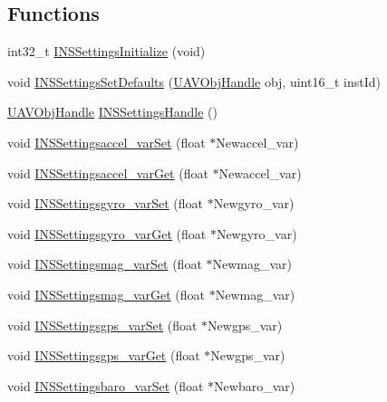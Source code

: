 \subsection*{\-Functions}
\begin{DoxyCompactItemize}
\item 
int32\-\_\-t \hyperlink{group___i_n_s_settings_ga0296ec40c6cd3d7e7ad7924e11409247}{\-I\-N\-S\-Settings\-Initialize} (void)
\item 
void \hyperlink{group___i_n_s_settings_ga27f5ee3b187af138d469575eb7a216e9}{\-I\-N\-S\-Settings\-Set\-Defaults} (\hyperlink{targets_2_u_a_v_objects_2inc_2uavobjectmanager_8h_a279053e22be53ce9f895043aaeb91e3b}{\-U\-A\-V\-Obj\-Handle} obj, uint16\-\_\-t inst\-Id)
\item 
\hyperlink{targets_2_u_a_v_objects_2inc_2uavobjectmanager_8h_a279053e22be53ce9f895043aaeb91e3b}{\-U\-A\-V\-Obj\-Handle} \hyperlink{group___i_n_s_settings_gab490723d4fa23d173e7dff613545c6b8}{\-I\-N\-S\-Settings\-Handle} ()
\item 
void \hyperlink{group___i_n_s_settings_ga04de3ca77dd5e44adbd3cd39f0b6efab}{\-I\-N\-S\-Settingsaccel\-\_\-var\-Set} (float $\ast$\-Newaccel\-\_\-var)
\item 
void \hyperlink{group___i_n_s_settings_ga4a62ce50a506308ba57016b882512c38}{\-I\-N\-S\-Settingsaccel\-\_\-var\-Get} (float $\ast$\-Newaccel\-\_\-var)
\item 
void \hyperlink{group___i_n_s_settings_gae8a5bd32b38c8e5f066c1509e9cef46a}{\-I\-N\-S\-Settingsgyro\-\_\-var\-Set} (float $\ast$\-Newgyro\-\_\-var)
\item 
void \hyperlink{group___i_n_s_settings_gadf76904ba3042ee04f21bedf5843dc3f}{\-I\-N\-S\-Settingsgyro\-\_\-var\-Get} (float $\ast$\-Newgyro\-\_\-var)
\item 
void \hyperlink{group___i_n_s_settings_gad29df915aa71a725e7ff2c2d7104b7ee}{\-I\-N\-S\-Settingsmag\-\_\-var\-Set} (float $\ast$\-Newmag\-\_\-var)
\item 
void \hyperlink{group___i_n_s_settings_ga0210efc70c1435e0d34ee92f6e633b75}{\-I\-N\-S\-Settingsmag\-\_\-var\-Get} (float $\ast$\-Newmag\-\_\-var)
\item 
void \hyperlink{group___i_n_s_settings_gae70bd95e7e76259976abe9d4c623d985}{\-I\-N\-S\-Settingsgps\-\_\-var\-Set} (float $\ast$\-Newgps\-\_\-var)
\item 
void \hyperlink{group___i_n_s_settings_gae6846da6591f525857b0b9e4e0b810e2}{\-I\-N\-S\-Settingsgps\-\_\-var\-Get} (float $\ast$\-Newgps\-\_\-var)
\item 
void \hyperlink{group___i_n_s_settings_ga98228556ebdb15c32c3540a24792b52d}{\-I\-N\-S\-Settingsbaro\-\_\-var\-Set} (float $\ast$\-Newbaro\-\_\-var)

\end{DoxyCompactItemize}
